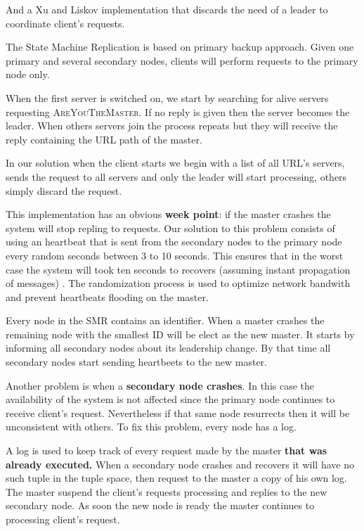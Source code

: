 \documentclass[times, 10pt,twocolumn]{article}
\begin{document}
And a Xu and Liskov implementation that discards the need of a leader to
coordinate client's requests.



The State Machine Replication is based on primary backup approach. Given one
primary and several secondary nodes, clients will perform requests to the
primary node only.

When the first server is switched on, we start by searching for alive servers
requesting \textsc{AreYouTheMaster}. If no reply is given then the server
becomes the leader. When others servers join the process repeats but they
will receive the reply containing the URL path of the master.


In our solution when the client starts we begin with a list of all URL's servers,
sends the request to all servers and only the leader will start processing, others
simply discard the request.

This implementation has an obvious \textbf{week point}: if the master crashes 
the system will stop repling to requests.
Our solution to this problem consists of using an heartbeat that is sent from the
secondary nodes to the primary node every random seconds between 3 to 10 seconds.
This ensures that in the worst case the system will took ten seconds to
recovers (assuming instant propagation of messages) . 
The randomization process is used to optimize network bandwith and
prevent heartbeats flooding on the master.

Every node in the SMR contains an identifier. When a master crashes the remaining
node with the smallest ID will be elect as the new master. It starts by informing
all secondary nodes about its leadership change. By that time all secondary nodes
start sending heartbeets to the new master.

Another problem is when a \textbf{secondary node crashes}. In this case the
availability of the system is not affected since the primary node continues 
to receive client's request. Nevertheless if that same node resurrects then it
will be unconsistent with others. To fix this problem, every node has a log.

A log is used to keep track of every request made by the master 
\textbf{that was already executed.} When a secondary node crashes and recovers
it will have no such tuple in the tuple space, then request to the master
a copy of his own log. The master suspend the client's requests processing and
replies to the new secondary node. As soon the new node is ready the master
continues to processing client's request.
\end{document}

